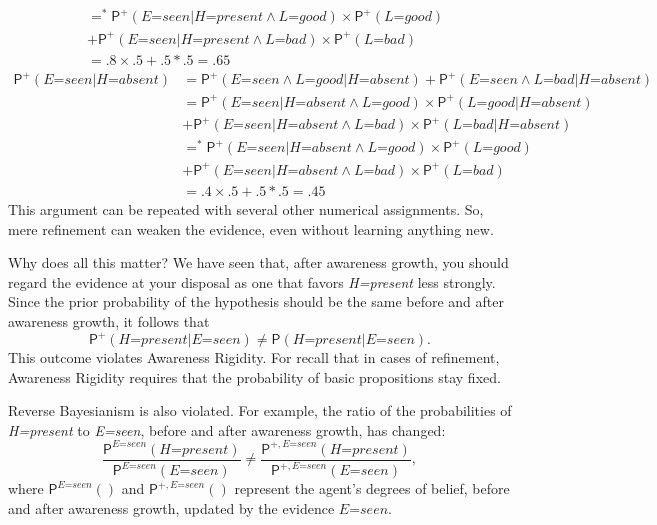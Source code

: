\documentclass[
  11pt,
  dvipsnames,enabledeprecatedfontcommands]{scrartcl}
\newcommand{\pr}[1]{\ensuremath{\mathsf{P}(#1)}}
\newcommand{\ppr}[2]{\ensuremath{\mathsf{P}^{#1}(#2)}}
\begin{document}
{\begin{align*}
  &=^* \ppr{+}{\textit{E=seen} \vert \textit{H=present} \wedge \textit{L=good}}  \times \ppr{+}{\textit{L=good}}\\ & +\ppr{+}{\textit{E=seen}  \vert \textit{H=present} \wedge \textit{L=bad}} \times \ppr{+}{\textit{L=bad}}\\
  &= .8 \times .5 +.5 *.5 = .65 
  \end{align*} \begin{align*}
  \ppr{+}{\textit{E=seen} \vert \textit{H=absent}} &= \ppr{+}{\textit{E=seen} \wedge \textit{L=good} \vert \textit{H=absent}}+\ppr{+}{\textit{E=seen} \wedge \textit{L=bad} \vert \textit{H=absent}}\\
  &= \ppr{+}{\textit{E=seen} \vert \textit{H=absent} \wedge \textit{L=good}}  \times \ppr{+}{\textit{L=good} \vert  \textit{H=absent} }\\ & +\ppr{+}{\textit{E=seen}  \vert \textit{H=absent} \wedge \textit{L=bad}} \times \ppr{+}{\textit{L=bad} \vert  \textit{H=absent}}\\
  &=^* \ppr{+}{\textit{E=seen} \vert \textit{H=absent} \wedge \textit{L=good}}  \times \ppr{+}{\textit{L=good}}\\ & +\ppr{+}{\textit{E=seen}  \vert \textit{H=absent} \wedge \textit{L=bad}} \times \ppr{+}{\textit{L=bad}}\\
  &= .4 \times .5 +.5 *.5 = .45 
  \end{align*} This argument can be repeated with several other
  numerical assignments.}
 So, mere
refinement can weaken the evidence, even without learning anything new.

Why does all this matter? We have seen that, after awareness growth, you
should regard the evidence at your disposal as one that favors
\textit{H=present} less strongly. Since the prior probability of the
hypothesis should be the same before and after awareness growth, it
follows that
\[\ppr{+}{\textit{H=present} \vert \textit{E=seen}} \neq \pr{\textit{H=present} \vert \textit{E=seen}}.\]
This outcome violates Awareness Rigidity. For recall that in cases of
refinement, Awareness Rigidity requires that the probability of basic
propositions stay fixed.

Reverse Bayesianism is also violated. For example, the ratio of the
probabilities of \textit{H=present} to \textit{E=seen}, before and after
awareness growth, has changed:
\[\frac{\ppr{\textit{E=seen}}{\textit{H=present}}}{\ppr{ \textit{E=seen}}{\textit{E=seen}}} \neq \frac{\ppr{+, \textit{E=seen}}{\textit{H=present}}}{\ppr{+, \textit{E=seen}}{\textit{E=seen}}},\]
where \(\ppr{\textit{E=seen}}{}\) and \(\ppr{+, \textit{E=seen}}{}\)
represent the agent's degrees of belief, before and after awareness
growth, updated by the evidence \(\textit{E=seen}\).
\end{document}
